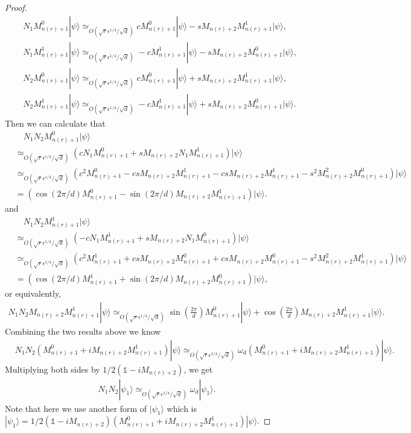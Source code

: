 \documentclass[11pt,letterpaper]{article}
\newcommand{\ket}[1]{|#1\rangle}
\newcommand{\1}{\mathbb{1}}
\newcommand{\nr}{n(r)}
\newcommand{\qe}{\epsilon^{1/4}}
\newcommand{\sd}{\sqrt{d}}
\newcommand{\sr}{\sqrt{r}}
\newcommand{\appd}[1]{\simeq_{#1}}
\theoremstyle{definition}
\begin{document}
\begin{proof}
        \begin{align}
        		&N_1M_{\nr+1}^0 \ket{\psi} \appd{O(\sr \qe/ \sd)} cM_{\nr+1}^0\ket{\psi} - sM_{\nr+2}M_{\nr+1}^1\ket{\psi},\\
        		&N_1M_{\nr+1}^1 \ket{\psi} \appd{O(\sr \qe/ \sd)} -cM_{\nr+1}^1\ket{\psi} - sM_{\nr+2}M_{\nr+1}^0\ket{\psi},\\
        		&N_2M_{\nr+1}^0 \ket{\psi} \appd{O( \sr \qe /\sd)} cM_{\nr+1}^0\ket{\psi} + sM_{\nr+2}M_{\nr+1}^1\ket{\psi},\\
        		&N_2M_{\nr+1}^1 \ket{\psi} \appd{O(\sr \qe/ \sd )} -cM_{\nr+1}^1\ket{\psi} + sM_{\nr+2}M_{\nr+1}^0\ket{\psi}.
        \end{align}
        Then we can calculate that 
        \begin{align*}
        		&\quad N_1N_2 M_{\nr+1}^0 \ket{\psi} \\
		&\appd{O(\sr \qe/\sd)} (c N_1M_{\nr+1}^0 +sM_{\nr+2}N_1M_{\nr+1}^1)\ket{\psi}\\
        		&\appd{O( \sr \qe/\sd)}(c^2M_{\nr+1}^0- csM_{\nr+2}M_{\nr+1}^1 -csM_{\nr+2}M_{\nr+1}^1 -s^2 M_{\nr+2}^2 M_{\nr+1}^0)\ket{\psi}\\
        		&= (\cos(2\pi/d) M_{\nr+1}^0 - \sin(2\pi/d) M_{\nr+2}M_{\nr+1}^1)\ket{\psi}.
        \end{align*}
        and 
        \begin{align*}
        		&\quad N_1N_2 M_{\nr+1}^1 \ket{\psi} \\
		&\appd{O( \sr \qe/\sd)} (-c N_1M_{\nr+1}^1 +sM_{\nr+2}N_1M_{\nr+1}^0)\ket{\psi}\\
        		&\appd{O(\sr \qe/\sd)}(c^2M_{\nr+1}^1+ csM_{\nr+2}M_{\nr+1}^0 +csM_{\nr+2}M_{\nr+1}^0 -s^2 M_{\nr+2}^2 M_{\nr+1}^1)\ket{\psi}\\
        		&= (\cos(2\pi/d) M_{\nr+1}^1 + \sin(2\pi/d) M_{\nr+2}M_{\nr+1}^0)\ket{\psi},
        \end{align*}
        or equivalently,
        \begin{align*}
        		N_1N_2 M_{\nr+2}M_{\nr+1}^1 \ket{\psi}\appd{O(\sr \qe/\sd)} 
		\sin(\frac{2\pi}{d}) M_{\nr+1}^0\ket{\psi} + \cos(\frac{2\pi}{d})M_{\nr+2}M_{\nr+1}^1\ket{\psi}.
        \end{align*}
        Combining the two results above we know
	\begin{align}
		\label{eq:omegad}
		&N_1N_2 (M_{\nr+1}^0 + i M_{\nr+2}M_{\nr+1}^1) \ket{\psi} 
		\appd{O(\sr \qe/\sd)}\omega_d(M_{\nr+1}^0 + iM_{\nr+2}M_{\nr+1}^1) \ket{\psi}.
	\end{align}
	Multiplying both sides by $1/2(\1 - iM_{\nr+2})$, we get
	\begin{align}
		N_1N_2 \ket{\psi_1} \appd{O(\sr \qe/\sd)} \omega_d\ket{\psi_1}.
	\end{align}
	Note that here we use another form of $\ket{\psi_1}$ which is 
	$\ket{\psi_1} = 1/2(\1 - iM_{\nr+2})(M_{\nr+1}^0 + i M_{\nr+2}M_{\nr+1}^1) \ket{\psi}$.
	

\end{proof}
\end{document}
